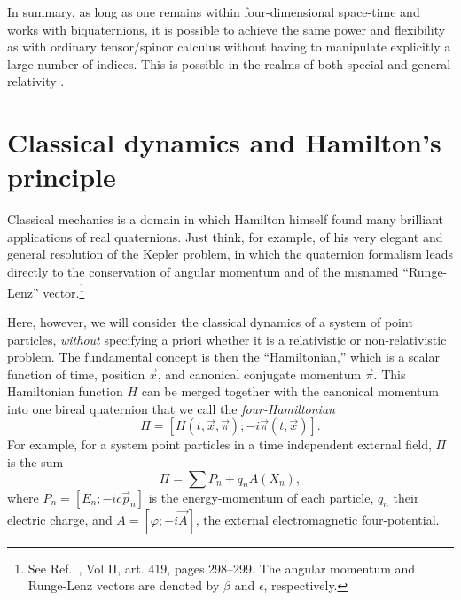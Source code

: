 \documentclass [12pt,a4paper      ]{article}
\begin{document}
     In  summary,  as long as one remains within four-dimensional 
space-time  and  works  with biquaternions,  it  is  possible  to 
achieve   the  same  power  and  flexibility  as  with   ordinary 
tensor/spinor  calculus without having to manipulate explicitly a 
large number of indices.   This is possible in the realms of both 
special and general relativity \cite{R12}.

\section{Classical dynamics and Hamilton's principle}
\label{cla:0}

     Classical  mechanics is a domain in which Hamilton  himself 
found  many  brilliant applications of  real  quaternions.   Just 
think, for example, of his very elegant and general resolution of 
the  Kepler  problem,  in  which the quaternion  formalism  leads 
directly  to  the  conservation of angular momentum  and  of  the 
misnamed ``Runge-Lenz'' vector.\footnote{See Ref.~\cite{R7},  Vol II,  art.  419,  pages 298--299.  The  angular momentum  and Runge-Lenz vectors are denoted by $\beta$ and $\epsilon$, respectively.}

     Here,  however, we will consider the classical dynamics of a 
system  of point particles,  {\it without} specifying a priori whether 
it is a relativistic or non-relativistic problem. The fundamental 
concept is then the ``Hamiltonian,''  which is a scalar function of time, 
position $\vec{x}$, and canonical conjugate momentum $\vec{\pi}$. This 
Hamiltonian 
function  $H$  can be merged together with the  canonical  momentum  
into one bireal quaternion that we call the \emph{four-Hamiltonian}
%
\begin{equation}\label{E23}
  \Pi = [H(t, \vec{x}, \vec{\pi}); -i \vec{\pi}(t, \vec{x}) ].  %
\end{equation}
%
For  example,  for a system point particles in a time independent 
external field, $\Pi$ is the sum
%
\begin{equation}\label{E24}
           \Pi  = \sum P_n   +  q_n A(X_n),     %
\end{equation} 
%
where $P_n = [ E_n; -i c \vec{p}_n]$ is the energy-momentum of each particle,  
$q_n$ their electric charge, and $A = [\varphi; -i \vec{A}]$, the external 
electromagnetic four-potential.
\end{document}
